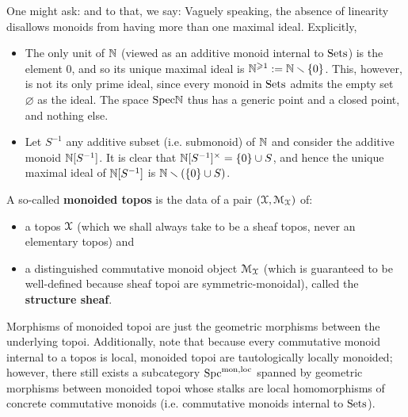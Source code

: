            \begin{remark} \label{remark: linearity_gives_rise_to_many_maximal_ideals}
                One might ask:  and to that, we say:  Vaguely speaking, the absence of linearity disallows monoids from having more than one maximal ideal. Explicitly,  
            \end{remark}
            \begin{example}
                \noindent
                \begin{itemize}
                    \item The only unit of $\mathbb{N}$ (viewed as an additive monoid internal to $\mathrm{Sets}$) is the element $0$, and so its unique maximal ideal is $\mathbb{N}^{\geqslant 1} := \mathbb{N} \smallsetminus \{0\}$. This, however, is not its only prime ideal, since every monoid in $\mathrm{Sets}$ admits the empty set $\varnothing$ as the  ideal. The space $\mathrm{Spec} \mathbb{N}$ thus has a generic point and a closed point, and nothing else.
                    \item Let $S^{-1}$ any additive subset (i.e. submonoid) of $\mathbb{N}$ and consider the additive monoid $\mathbb{N}[S^{-1}]$. It is clear that $\N[S^{-1}]^{\x} = \{0\} \cup S$, and hence the unique maximal ideal of $\mathbb{N}[S^{-1}]$ is $\mathbb{N} \smallsetminus (\{0\} \cup S)$. 
                \end{itemize}
            \end{example}
            \begin{definition} \label{def: monoided_topoi}
                A so-called \textbf{monoided topos} is the data of a pair $(\mathcal{X}, \mathcal{M}_{\mathcal{X}})$ of:
                    \begin{itemize}
                        \item a topos $\mathcal{X}$ (which we shall always take to be a sheaf topos, never an elementary topos) and
                        \item a distinguished commutative monoid object $\mathcal{M}_{\mathcal{X}}$ (which is guaranteed to be well-defined because sheaf topoi are symmetric-monoidal), called the \textbf{structure sheaf}.
                    \end{itemize}
                Morphisms of monoided topoi are just the geometric morphisms between the underlying topoi. Additionally, note that because every commutative monoid internal to a topos is local, monoided topoi are tautologically locally monoided; however, there still exists a subcategory $\mathrm{Spc}^{\mathrm{mon}, \mathrm{loc}}$ spanned by geometric morphisms between monoided topoi whose stalks are local homomorphisms of concrete commutative monoids (i.e. commutative monoids internal to $\mathrm{Sets}$).
            \end{definition}
            
